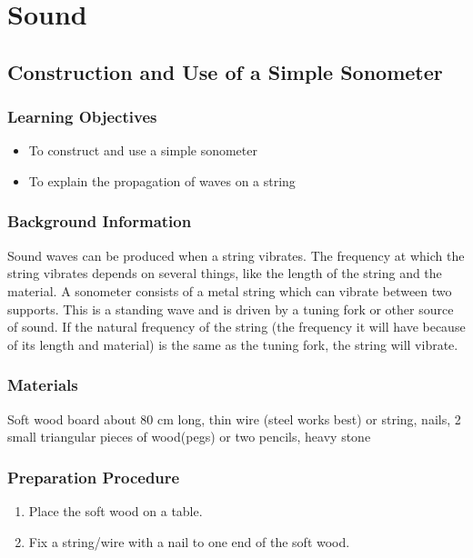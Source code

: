 \section{Sound}

\subsection{Construction and Use of a Simple Sonometer}

\subsubsection*{Learning Objectives}
\begin{itemize}
\item{To construct and use a simple sonometer} 
\item{To explain the propagation of waves on a string} 
\end{itemize}

\subsubsection*{Background Information}
Sound waves can be produced when a string vibrates. The frequency at which the string vibrates depends on several things, like the length of the string and the material. A sonometer consists of a metal string which can vibrate between two supports. This is a standing wave and is driven by a tuning fork or other source of sound. If the natural frequency of the string (the frequency it will have because of its length and material) is the same as the tuning fork, the string will vibrate.  

\subsubsection*{Materials}
Soft wood board about 80 cm long, thin wire (steel works best) or string, nails, 2 small triangular pieces of wood(pegs) or two pencils, heavy stone

\subsubsection*{Preparation Procedure}
\begin{enumerate}
\item{Place the soft wood on a table.} 
\item{Fix a string/wire with a nail to one end of the soft wood.} 
\end{enumerate}

